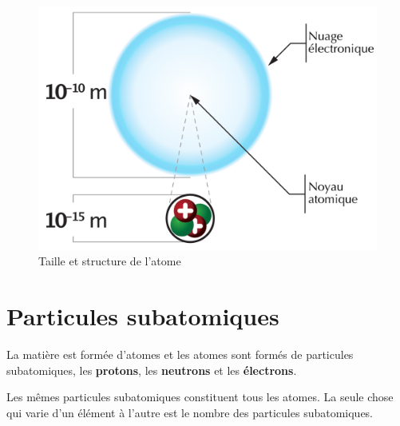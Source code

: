 \documentclass[
  11pt,
  a4paper,
  openany]{book}
\begin{document}
\begin{figure}

{\centering \includegraphics[width=0.33\linewidth]{images/ordre-grandeur-atome} 

}

\caption{Taille et structure de l'atome}\label{fig:ordre-grandeur-atome}
\end{figure}

\section{Particules subatomiques}\label{particules-subatomiques}

La matière est formée d'atomes et les atomes sont formés de particules subatomiques, les \textbf{protons}, les \textbf{neutrons} et les \textbf{électrons}.

Les mêmes particules subatomiques constituent tous les atomes. La seule chose qui varie d'un élément à l'autre est le nombre des particules subatomiques.
\end{document}
